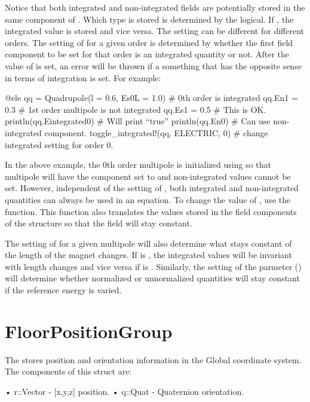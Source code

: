 Notice that both integrated
and non-integrated fields are potentially stored in the same component of .
Which type is stored is determined by the  logical. If , the integrated
value is stored and vice versa. The  setting can be different for different orders.
The setting of  for a given order is determined by whether the first field component
to be set for that order is an integrated quantity or not. After the value of  is set,
an error will be thrown if a something that has the opposite sense in terms of integration is 
set. For example:
\begin{example}
  @ele qq = Quadrupole(l = 0.6, Es0L = 1.0)  # 0th order is integrated
  qq.En1 = 0.3                  # 1st order multipole is not integrated
  qq.Es1 = 0.5                  # This is OK.
  println(qq.Eintegrated0)      # Will print ``true''
  println(qq.En0)               # Can use non-integrated component.
  toggle_integrated!(qq, ELECTRIC, 0)  # change integrated setting for order 0.
\end{example}
In the above example, the 0th order multipole is initialized using  so that
multipole will have the  component set to  and non-integrated values
cannot be set. However, independent of the setting of , both integrated and
non-integrated quantities can always be used in an equation. To change the value of ,
use the  function. This function also translates the values stored in the
field components of the structure so that the field will stay constant.

The setting of  for a given multipole will also determine what stays constant
of the length of the magnet changes. If  is , the integrated values
will be invariant with length changes and vice versa if  is . 
Similarly, the setting of the  parmeter () will determine 
whether normalized or unnormalized quantities will stay constant if the reference energy is varied.

\section{FloorPositionGroup}
\label{s:floor.pos.g}

The  stores position and orientation information in the Global coordinate 
system. The components of this struct are:
\begin{example}
• r::Vector              - [x,y,z] position. 
• q::Quat                - Quaternion orientation. 
\end{example}

